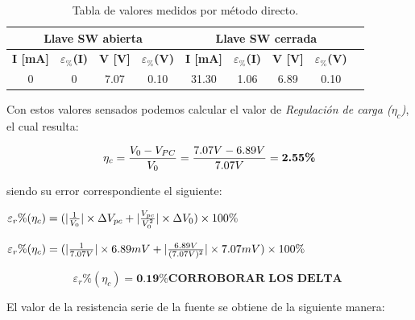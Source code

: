 \documentclass{article}
\begin{document}
\begin{table}[!hbt]
	\begin{center}

		\begin{tabular}{|c|c|c|c|c|c|c|c|c|} \hline
			\multicolumn{4}{|c|}{\textbf{Llave SW abierta}} & \multicolumn{4}{c|}{\textbf{Llave SW cerrada}} \\ \hline
			\textbf{I [mA]} & \textbf{$\varepsilon_{\%}$(I)} & \textbf{V [V]} & \textbf{$\varepsilon_{\%}$(V)} & \textbf{I [mA]} & \textbf{$\varepsilon_{\%}$(I)} & \textbf{V [V]} & \textbf{$\varepsilon_{\%}$(V)} \\\cline{1-8}
			0 & 0 & 7.07 & 0.10 & 31.30 & 1.06 & 6.89 & 0.10 \\\cline{1-8}
		\end{tabular}

	\caption{Tabla de valores medidos por método directo.}
	\end{center}
\end{table}
\bigskip



Con estos valores sensados podemos calcular el valor de \textit{Regulación de carga ($\eta_c$)}, el cual resulta:
\bigskip

\begin{equation}
 	\eta_c = {V_0 - V_{PC} \over V_0} = {7.07V - 6.89V \over 7.07V} = \textbf{2.55\%}
\end{equation}
\bigskip


\newpage
\noindent siendo su error correspondiente el siguiente:
\bigskip

\begin{center}
	$\varepsilon_r\%(\eta_c) = (|{1 \over V_{0}}| \times \Delta V_{pc} + |{V_{pc} \over V_{0}^2}| \times \Delta V_{0})\times 100\% $ \\
\end{center}

\begin{center}
	$\varepsilon_r\%(\eta_c) = (|{1 \over 7.07V}| \times 6.89mV + |{6.89V \over (7.07V)^2}| \times 7.07mV)\times 100\%$ \\
\end{center}

\begin{equation}
	\varepsilon_r\%(\eta_c) = \textbf{0.19\% CORROBORAR LOS DELTA }
\end{equation}

\bigskip\bigskip


\noindent El valor de la resistencia serie de la fuente se obtiene de la siguiente manera:
\bigskip
\end{document}
